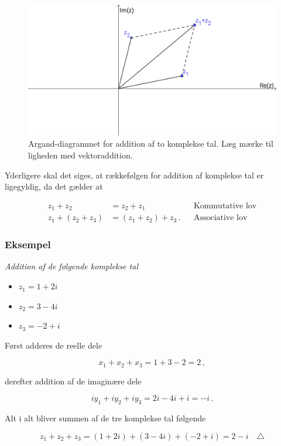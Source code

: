 \documentclass[a4paper, 12pt,titlepage]{article}
\begin{document}
\begin{figure}[htbp]
\centering
\includegraphics[width=.9\linewidth]{./img/argand_addition.png}
\caption{\label{argand_addition}Argand-diagrammet for addition af to komplekse tal. Læg mærke til ligheden med vektoraddition.}
\end{figure}

Yderligere skal det siges, at rækkefølgen for addition af komplekse tal er ligegyldig, da det gælder at

\begin{align*}
    z_1 + z_2 &= z_2 + z_1 & &\text{Kommutative lov}\\
    z_1 + (z_2 + z_3) &= (z_1 + z_2) + z_3 \,. & &\text{Associative lov}
\end{align*}

\subsubsection*{\textbf{Eksempel}}
\label{sec:org08da5c9}
\emph{Addition af de følgende komplekse tal}

\begin{itemize}
\item \(z_1 = 1 + 2i\)
\item \(z_2 = 3-4i\)
\item \(z_3 = -2 +i\)
\end{itemize}

Først adderes de reelle dele

$$x_1 + x_2 + x_3 = 1 + 3 - 2 = 2\,,$$

derefter addition af de imaginære dele

$$i y_1 + i y_2 + i y_3 = 2i - 4i + i = -i \,.$$

Alt i alt bliver summen af de tre komplekse tal følgende

$$z_1+z_2+z_3 = (1+2i) + (3-4i) + (-2+i) = 2 - i \quad \triangle$$
\end{document}
